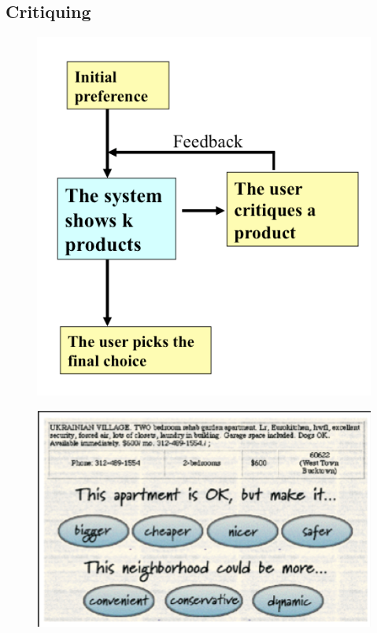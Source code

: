 \subsection{Critiquing}
\label{sec:critiquing}

\begin{figure}
\centering
\begin{minipage}{.5\textwidth}
  \centering
  \includegraphics[width=1\linewidth]{figures-bharath/critiquing.png}
  \label{fig:critiquing}
\end{minipage}%
\begin{minipage}{.5\textwidth}
  \centering
  \includegraphics[width=1\linewidth]{figures-bharath/rentMe.png}
  \label{fig:rentMe}
\end{minipage}
\end{figure}
